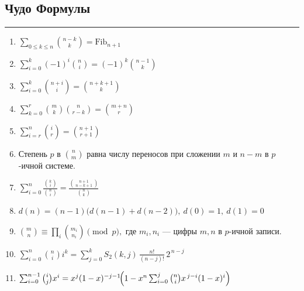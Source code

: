 \documentclass[9pt,a4paper,landscape,twosided]{extarticle}
\begin{document}
\begin{multicols*}{3}
\subsection{Чудо Формулы}
\noindent\rule{\linewidth}{0.15mm}

\begingroup
\small

\begin{enumerate}
\item %
$\sum_{0\le k\le n}\binom{n-k}{k}=\mathrm{Fib}_{n+1}$

\item %
$\sum_{i=0}^{k}(-1)^i\binom{n}{i}=(-1)^k\binom{n-1}{k}$

\item %
$\sum_{i=0}^{k}\binom{n+i}{i}=\binom{n+k+1}{k}$

\item %
$\sum_{k=0}^{r}\binom{m}{k}\binom{n}{r-k}=\binom{m+n}{r}$

\item %
$\sum_{i=r}^{n}\binom{i}{r}=\binom{n+1}{r+1}$

\item %
Степень $p$ в $\binom{n}{m}$ равна числу переносов при сложении $m$ и $n-m$ в $p$-ичной системе.

\item %
$\sum_{i=0}^{n}\frac{\binom{k}{i}}{\binom{n}{i}}
=\frac{\binom{n+1}{\,n-k+1\,}}{\binom{n}{k}}$

\item %
$d(n)=(n-1)\bigl(d(n-1)+d(n-2)\bigr),\  d(0)=1,\ d(1)=0$

\item %
$\binom{m}{n}\equiv\prod_i\binom{m_i}{n_i}\pmod p,$
\quad где $m_i,n_i$ — цифры $m,n$ в $p$-ичной записи.

\item %
$\sum_{i=0}^{n}\binom{n}{i}i^k
=\sum_{j=0}^{k}S_2(k,j)\,\frac{n!}{(n-j)!}\,2^{\,n-j}$

\item %
$\sum_{i=0}^{n-1}\binom{i}{j}x^i
= x^j(1-x)^{-j-1}\!\Bigl(1-x^n\sum_{i=0}^j\binom{n}{i}x^{\,j-i}(1-x)^i\Bigr)$


\end{enumerate}
\end{multicols*}
\end{document}
